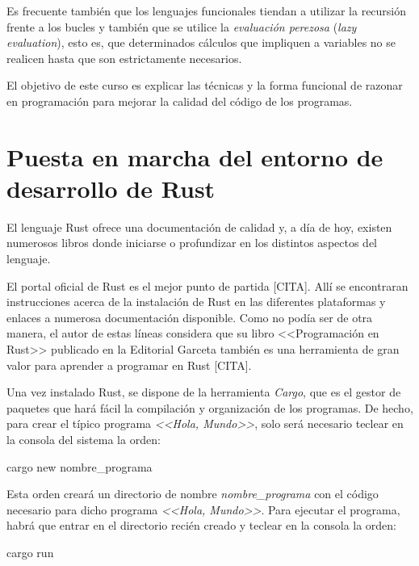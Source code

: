 \documentclass[a4paper,11pt]{extarticle}
\begin{document}
Es frecuente también que los lenguajes funcionales tiendan a utilizar la recursión frente a los bucles y también que se utilice la \textit{evaluación perezosa} (\textit{lazy evaluation}), esto es, que determinados cálculos que impliquen a variables no se realicen hasta que son estrictamente necesarios.

El objetivo de este curso es explicar las técnicas y la forma funcional de razonar en programación para mejorar la calidad del código de los programas.

\section{Puesta en marcha del entorno de desarrollo de Rust}



El lenguaje Rust ofrece una documentación de calidad y, a día de hoy, existen numerosos libros donde iniciarse o profundizar en los distintos aspectos del lenguaje.

El portal oficial de Rust es el mejor punto de partida [CITA]. Allí se encontraran instrucciones acerca de la instalación de Rust en las diferentes plataformas y enlaces a numerosa documentación disponible. Como no podía ser de otra manera, el autor de estas líneas considera que su libro <<Programación en Rust>> publicado en la Editorial Garceta también es una herramienta de gran valor para aprender a programar en  Rust [CITA].

Una vez instalado Rust, se dispone de la herramienta \textit{Cargo}, que es el gestor de paquetes que hará fácil la compilación y organización de los programas. De hecho, para crear el típico programa \textit{<<Hola, Mundo>>}, solo será necesario teclear en la consola del sistema la orden:

\vspace{0.7em}
\begin{Codigo2}
cargo new nombre_programa
\end{Codigo2}

Esta orden creará un directorio de nombre \textit{nombre\_programa} con el código necesario para dicho programa \textit{<<Hola, Mundo>>}. Para ejecutar el programa, habrá que entrar en el directorio recién creado y teclear en la consola la orden:

\vspace{0.7em}
\begin{Codigo2}
cargo run
\end{Codigo2}
\end{document}

